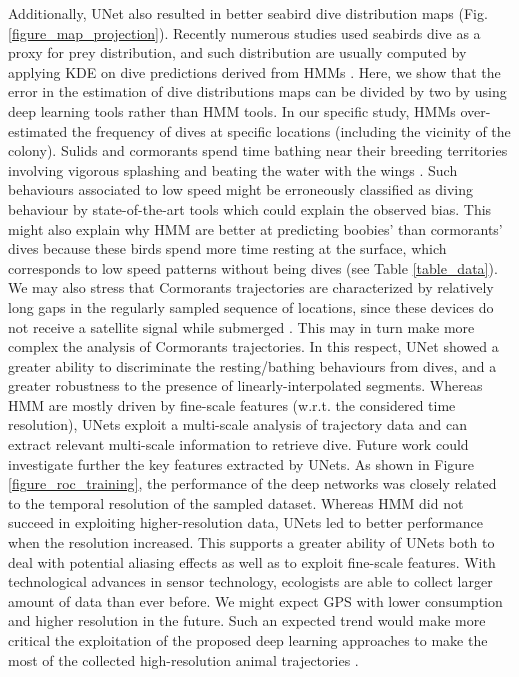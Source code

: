 \documentclass{article}
\begin{document}
Additionally, UNet also resulted in better seabird dive distribution maps (Fig. \ref{figure_map_projection}). Recently numerous studies used seabirds dive as a proxy for prey distribution, and such distribution are usually computed by applying KDE on dive predictions derived from HMMs \cite{delord_movements_2020,weimerskirch_at-sea_2020,zhang_gps_2019}. Here, we show that the error in the estimation of dive distributions maps can be divided by two by using deep learning tools rather than HMM tools. In our specific study, HMMs over-estimated the frequency of dives at specific locations (including the vicinity of the colony). Sulids and cormorants spend time bathing near their breeding territories involving vigorous splashing and beating the water with the wings \cite{nelson_pelicans_2005}. Such behaviours associated to low speed might be erroneously classified as diving behaviour by state-of-the-art tools which could explain the observed bias. This might also explain why HMM are better at predicting boobies' than cormorants' dives because these birds spend more time resting at the surface, which corresponds to low speed patterns without being dives (see Table \ref{table_data}). We may also stress that Cormorants trajectories are characterized by relatively long gaps in the regularly sampled sequence of locations, since these devices do not receive a satellite signal while submerged \cite{boyd_movement_2014,wilson_technological_2012}. This may in turn make more complex the analysis of Cormorants trajectories. In this respect, UNet showed a greater ability to  discriminate the resting/bathing behaviours from dives, and a greater robustness to the presence of linearly-interpolated segments. Whereas HMM are mostly driven by fine-scale features (w.r.t. the considered time resolution), UNets exploit a multi-scale analysis of trajectory data and can extract relevant multi-scale information to retrieve dive. Future work could investigate further the key features extracted by UNets. As shown in Figure \ref{figure_roc_training}, the performance of the deep networks was closely related to the temporal resolution of the sampled dataset. Whereas HMM did not succeed in exploiting higher-resolution data, UNets led to better performance when the resolution increased. This supports a greater ability of UNets both to deal with potential aliasing effects as well as to exploit fine-scale features. With technological advances in sensor technology, ecologists are able to collect larger amount of data than ever before. We might expect GPS with lower consumption and higher resolution in the future. Such an expected trend would make more critical the exploitation of the proposed deep learning approaches to make the most of the collected high-resolution  animal trajectories   \cite{beyan_setting_2020,malde_machine_2020, yoda_advances_2019}.
\end{document}
